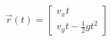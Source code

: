 \documentclass[preview]{standalone}
\begin{document}
\begin{align*}
\vec{r}(t) = \begin{bmatrix} v_x t \\ v_y t - \frac{1}{2}gt^2 \end{bmatrix}
\end{align*}
\end{document}
